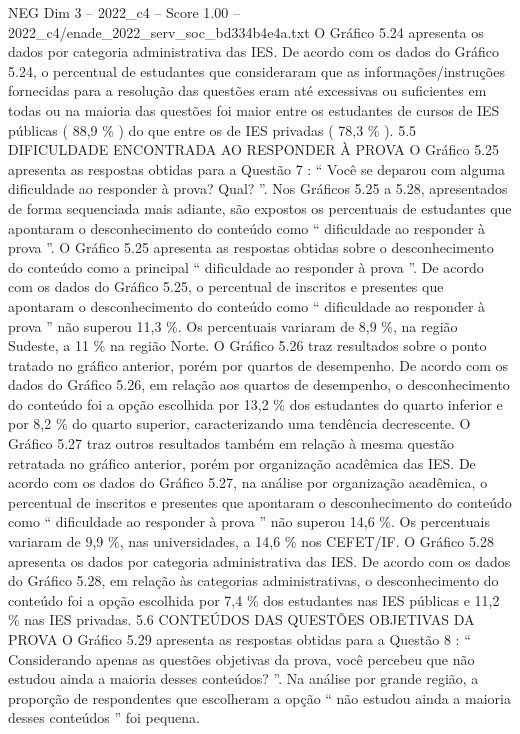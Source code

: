 \begin{textsample}{NEG Dim 3 – 2022\_c4 – Score 1.00 – 2022\_c4/enade\_2022\_serv\_soc\_bd334b4e4a.txt}
O Gráfico 5.24 apresenta os dados por categoria administrativa das IES.
De acordo com os dados do Gráfico 5.24, o percentual de estudantes que consideraram que as informações/instruções fornecidas para a resolução das questões eram até excessivas ou suficientes em todas ou na maioria das questões foi maior entre os estudantes de cursos de IES públicas ( 88,9 \% ) do que entre os de IES privadas ( 78,3 \% ). 5.5 DIFICULDADE ENCONTRADA AO RESPONDER À PROVA O Gráfico 5.25 apresenta as respostas obtidas para a Questão 7 : “ Você se deparou com alguma dificuldade ao responder à prova?
Qual? ”.
Nos Gráficos 5.25 a 5.28, apresentados de forma sequenciada mais adiante, são expostos os percentuais de estudantes que apontaram o desconhecimento do conteúdo como “ dificuldade ao responder à prova ”.
O Gráfico 5.25 apresenta as respostas obtidas sobre o desconhecimento do conteúdo como a principal “ dificuldade ao responder à prova ”.
De acordo com os dados do Gráfico 5.25, o percentual de inscritos e presentes que apontaram o desconhecimento do conteúdo como “ dificuldade ao responder à prova ” não superou 11,3 \%.
Os percentuais variaram de 8,9 \%, na região Sudeste, a 11 \% na região Norte.
O Gráfico 5.26 traz resultados sobre o ponto tratado no gráfico anterior, porém por quartos de desempenho.
De acordo com os dados do Gráfico 5.26, em relação aos quartos de desempenho, o desconhecimento do conteúdo foi a opção escolhida por 13,2 \% dos estudantes do quarto inferior e por 8,2 \% do quarto superior, caracterizando uma tendência decrescente.
O Gráfico 5.27 traz outros resultados também em relação à mesma questão retratada no gráfico anterior, porém por organização acadêmica das IES.
De acordo com os dados do Gráfico 5.27, na análise por organização acadêmica, o percentual de inscritos e presentes que apontaram o desconhecimento do conteúdo como “ dificuldade ao responder à prova ” não superou 14,6 \%.
Os percentuais variaram de 9,9 \%, nas universidades, a 14,6 \% nos CEFET/IF.
O Gráfico 5.28 apresenta os dados por categoria administrativa das IES.
De acordo com os dados do Gráfico 5.28, em relação às categorias administrativas, o desconhecimento do conteúdo foi a opção escolhida por 7,4 \% dos estudantes nas IES públicas e 11,2 \% nas IES privadas. 5.6 CONTEÚDOS DAS QUESTÕES OBJETIVAS DA PROVA O Gráfico 5.29 apresenta as respostas obtidas para a Questão 8 : “ Considerando apenas as questões objetivas da prova, você percebeu que não estudou ainda a maioria desses conteúdos? ”.
Na análise por grande região, a proporção de respondentes que escolheram a opção “ não estudou ainda a maioria desses conteúdos ” foi pequena.

\end{textsample}
